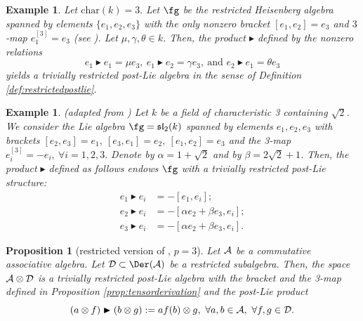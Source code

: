 \documentclass[12pt]{article}
\newcommand {\A}{{\cal{A}}}
\newcommand{\D}{{\cal{D}}}
\newcommand{\btr}{\blacktriangleright}
\newtheorem{example}[theorem]{Example}
\newtheorem{proposition}[theorem]{Proposition}
\begin{document}
    
\begin{example}
   Let $\text{char}(k)=3.$ Let $\fg$ be the restricted Heisenberg algebra spanned by elements $\{e_1,e_2,e_3\}$ with the only nonzero bracket $[e_1,e_2]=e_3$ and $3$-map $e_1^{[3]}=e_3$ (see \cite{EM}). Let $\mu,\gamma,\theta\in k$. Then, the product $\btr$ defined by the nonzero relations
    \begin{equation}
        e_1\btr e_1=\mu e_3,~e_1\btr e_2=\gamma e_3,~\text{and }e_2\btr e_1=\theta e_3
    \end{equation} yields a trivially restricted post-Lie algebra in the sense of Definition \ref{def:restrictedpostlie}.     
\end{example}

\begin{example} (adapted from \cite{PLBG}) Let $k$ be a field of characteristic 3 containing $\sqrt{2}$. We consider the Lie algebra $\fg=\mathfrak{sl}_2(k)$ spanned by elements $e_1,e_2,e_3$ with brackets $[e_2,e_3]=e_1,~[e_3,e_1]=e_2,~[e_1,e_2]=e_3$ and the 3-map $e_i^{[3]}=-e_i,~\forall i=1,2,3.$ Denote by $\alpha=1+\sqrt{2}$ and by $\beta=2\sqrt{2}+1$. Then, the product $\btr$ defined as follows endows $\fg$ with a trivially restricted post-Lie structure:
\begin{align*}
    e_1\btr e_i&=-[e_1,e_i];\\
    e_2\btr e_i&=-[\alpha e_2+\beta e_3,e_i];\\
    e_3\btr e_i&=-[\alpha e_2+\beta e_3,e_i].
\end{align*}

\end{example}


\begin{proposition}[restricted version of , $p=3$]\label{prop:JZp=3}
      Let $\A$ be a commutative associative algebra. Let $\D\subset\Der(\A)$ be a restricted subalgebra. Then, the space $\A\otimes\D$ is a trivially restricted post-Lie algebra with the bracket and the 3-map defined in Proposition \ref{prop:tensorderivation} and the post-Lie product
      \begin{equation}
        (a\otimes f)\btr(b\otimes g):=af(b)\otimes g,~\forall a,b\in \A,~\forall f,g\in \D.     
        \end{equation}
      \end{proposition}
\end{document}

